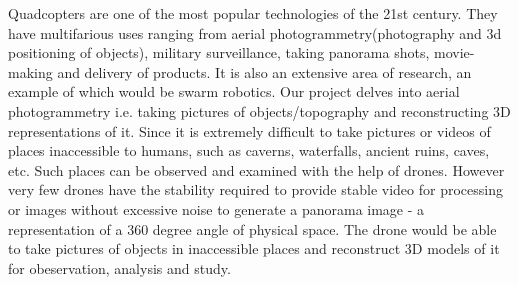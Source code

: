 Quadcopters are one of the most popular technologies of the 21st century. They have multifarious uses ranging from aerial photogrammetry(photography and 3d positioning of objects), military surveillance, taking panorama shots, movie-making and delivery of products. It is also an extensive area of research, an example of which would be swarm robotics.
\linebreak
Our project delves into aerial photogrammetry i.e. taking pictures of objects/topography and reconstructing 3D representations of it. Since it is extremely difficult to take pictures or videos of places inaccessible to humans, such as caverns, waterfalls, ancient ruins, caves, etc. Such places can be observed and examined with the help of drones.
\linebreak
However very few drones have the stability required to provide stable video for processing or images without excessive noise to generate a panorama image - a representation of a 360 degree angle of physical space.
The drone would be able to take pictures of objects in inaccessible places and reconstruct 3D models of it for obeservation, analysis and study.
